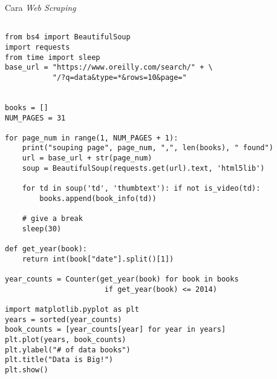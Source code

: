 \label{lampiran1}

\lipsum[1] %

\begin{myblock}{Cara \textit{Web Scraping}}\label{Lampiran1}
\begin{verbatim}

from bs4 import BeautifulSoup
import requests
from time import sleep
base_url = "https://www.oreilly.com/search/" + \
           "/?q=data&type=*&rows=10&page="


books = []
NUM_PAGES = 31

for page_num in range(1, NUM_PAGES + 1):
    print("souping page", page_num, ",", len(books), " found")
    url = base_url + str(page_num)
    soup = BeautifulSoup(requests.get(url).text, 'html5lib')
    
    for td in soup('td', 'thumbtext'): if not is_video(td):
        books.append(book_info(td))
        
    # give a break
    sleep(30)

def get_year(book):
    return int(book["date"].split()[1])

year_counts = Counter(get_year(book) for book in books 
                       if get_year(book) <= 2014)

import matplotlib.pyplot as plt
years = sorted(year_counts)
book_counts = [year_counts[year] for year in years] 
plt.plot(years, book_counts)
plt.ylabel("# of data books")
plt.title("Data is Big!")
plt.show()

\end{verbatim}
\end{myblock}

